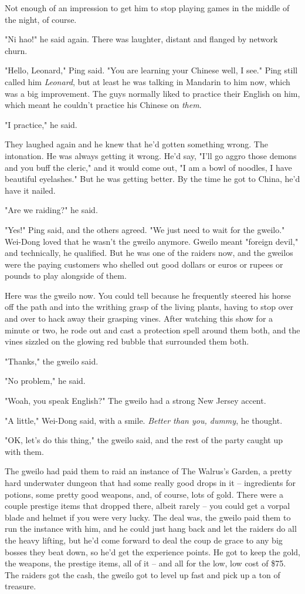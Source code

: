 Not enough of an impression to get him to stop playing games in the
middle of the night, of course.

"Ni hao!" he said again. There was laughter, distant and flanged by
network churn.

"Hello, Leonard," Ping said. "You are learning your Chinese well, I
see." Ping still called him \emph{Leonard}, but at least he was
talking in Mandarin to him now, which was a big improvement. The
guys normally liked to practice their English on him, which meant
he couldn't practice his Chinese on \emph{them}.

"I practice," he said.

They laughed again and he knew that he'd gotten something wrong.
The intonation. He was always getting it wrong. He'd say, "I'll go
aggro those demons and you buff the cleric," and it would come out,
"I am a bowl of noodles, I have beautiful eyelashes." But he was
getting better. By the time he got to China, he'd have it nailed.

"Are we raiding?" he said.

"Yes!" Ping said, and the others agreed. "We just need to wait for
the gweilo." Wei-Dong loved that he wasn't the gweilo anymore.
Gweilo meant "foreign devil," and technically, he qualified. But he
was one of the raiders now, and the gweilos were the paying
customers who shelled out good dollars or euros or rupees or pounds
to play alongside of them.

Here was the gweilo now. You could tell because he frequently
steered his horse off the path and into the writhing grasp of the
living plants, having to stop over and over to hack away their
grasping vines. After watching this show for a minute or two, he
rode out and cast a protection spell around them both, and the
vines sizzled on the glowing red bubble that surrounded them both.

"Thanks," the gweilo said.

"No problem," he said.

"Woah, you speak English?" The gweilo had a strong New Jersey
accent.

"A little," Wei-Dong said, with a smile.
\emph{Better than you, dummy}, he thought.

"OK, let's do this thing," the gweilo said, and the rest of the
party caught up with them.

The gweilo had paid them to raid an instance of The Walrus's
Garden, a pretty hard underwater dungeon that had some really good
drops in it -- ingredients for potions, some pretty good weapons,
and, of course, lots of gold. There were a couple prestige items
that dropped there, albeit rarely -- you could get a vorpal blade
and helmet if you were very lucky. The deal was, the gweilo paid
them to run the instance with him, and he could just hang back and
let the raiders do all the heavy lifting, but he'd come forward to
deal the coup de grace to any big bosses they beat down, so he'd
get the experience points. He got to keep the gold, the weapons,
the prestige items, all of it -- and all for the low, low cost of
\$75. The raiders got the cash, the gweilo got to level up fast and
pick up a ton of treasure.

